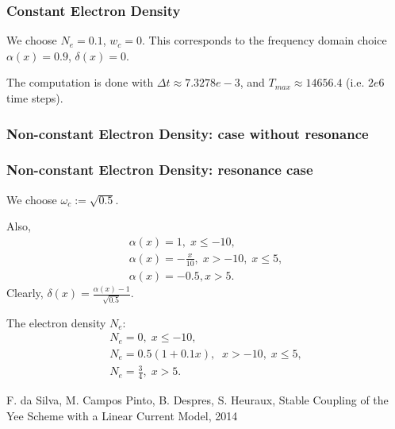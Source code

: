 \documentclass[a4paper,10pt]{article}
\begin{document}
\subsubsection{Constant Electron Density}
We choose $N_e=0.1$, $w_c=0$. This corresponds to the frequency domain choice $\alpha(x)=0.9$, $\delta(x)=0$. 

The computation is done with $\Delta t\approx 7.3278e-3$, 
and $T_{max}\approx 14656.4$ (i.e. $2e6$ time steps).








\subsubsection{Non-constant Electron Density: case without resonance}

\subsubsection{Non-constant Electron Density: resonance case}
We choose $\omega_c:=\sqrt{0.5}$.

Also, 
\begin{align*}
\alpha(x)=1,\; x\leq -10,\\
\alpha(x)=-\frac{x}{10}, \; x>-10,\; x\leq 5,\\
\alpha(x)=-0.5, x>5.
\end{align*}
Clearly, $\delta(x)=\frac{\alpha(x)-1}{\sqrt{0.5}}$.

The electron density $N_e$:
\begin{align*}
 N_e=0,\; x\leq -10,\\
 N_e=0.5(1+0.1x),\;  \; x>-10,\; x\leq 5,\\
 N_e=\frac{3}{4},\; x>5.
\end{align*}






\begin{thebibliography}{99}
 F. da Silva, M. Campos Pinto, B. Despres, S. Heuraux, Stable Coupling of the Yee Scheme with a Linear Current Model,
2014
\end{thebibliography}
\end{document}
